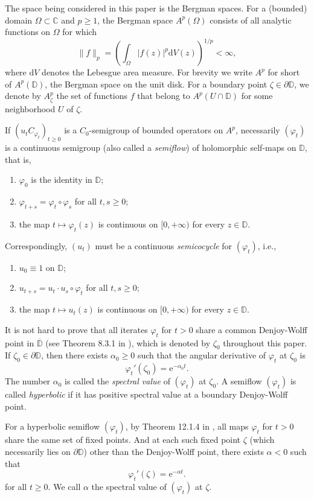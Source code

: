 \documentclass{amsart}
\theoremstyle{proclaim}
\theoremstyle{fancyproclaim}
\theoremstyle{definition}
\theoremstyle{fancystatement}
\numberwithin{equation}{section}
\begin{document}
The space being considered in this paper is the Bergman spaces. For a (bounded) domain $\Omega\subset\mathbb{C}$ and $p\geq 1$, the Bergman space $A^p(\Omega)$ consists of all analytic functions on $\Omega$ for which
$$\|f\|_p=\left(\int_\Omega|f(z)|^p\mathrm{d}V(z)\right)^{1/p}<\infty,$$
where $\mathrm{d}V$ denotes the Lebesgue area measure. For brevity we write $A^p$ for short of $A^p(\mathbb{D})$, the Bergman space on the unit disk. For a boundary point $\zeta\in\partial \mathbb{D}$, we denote by $A^p_\zeta$ the set of functions $f$  that belong to $A^p(U\cap\mathbb{D})$ for some neighborhood $U$ of $\zeta$.

If $(u_tC_{\varphi_t})_{t\geq0}$ is a  $C_0$-semigroup of bounded operators on $A^p$, necessarily $(\varphi_t)$ is a continuous semigroup (also called a \emph{semiflow}) of holomorphic self-maps on $\mathbb{D}$, that is,
\begin{enumerate}
\item $\varphi_0$ is the identity in $\mathbb{D}$;
\item $\varphi_{t+s} = \varphi_t \circ\varphi_s$ for all $t,s \geq 0$;
\item the map $t \mapsto \varphi_t(z)$ is continuous on $[0,+\infty)$ for every $z \in\mathbb{D}$.
\end{enumerate}
Correspondingly, $(u_t)$ must be a continuous  \emph{semicocycle} for  $(\varphi_t)$, i.e.,
\begin{enumerate}
\item $u_0 \equiv 1$ on $\mathbb{D}$;
\item $u_{t+s}=u_t  \cdot u_s\circ\varphi_t$ for all $t,s\geq0$;
\item the map $t \mapsto u_t(z)$ is continuous on $[0,+\infty)$ for every $z \in \mathbb{D}$.
\end{enumerate}


It is not hard to prove that all iterates $\varphi_t$ for $t>0$ share a common Denjoy-Wolff point in $\overline{\mathbb{D}}$ (see Theorem 8.3.1 in \cite{cs}), which is denoted by $\zeta_0$ throughout this paper. If $\zeta_0\in \partial \mathbb{D}$, then there exists $\alpha_0\geq0$ such that the angular derivative of $\varphi_t$ at $\zeta_0$ is
$$\varphi_t'(\zeta_0)= \mathrm{e}^{-\alpha_0t}.$$
The number $\alpha_0$ is called the \emph{spectral value} of  $(\varphi_t)$ at $\zeta_0$. A semiflow  $(\varphi_t)$ is called \emph{hyperbolic} if it has positive spectral value at a boundary Denjoy-Wolff point.


For a hyperbolic semiflow  $(\varphi_t)$, by Theorem 12.1.4 in \cite{cs}, all maps $\varphi_t$ for $t>0$ share the same set of fixed points. And at each such fixed point $\zeta$ (which necessarily lies on $\partial\mathbb{D}$) other than the Denjoy-Wolff point, there exists $\alpha<0$ such that 
$$\varphi_t'(\zeta)= \mathrm{e}^{-\alpha t}.$$
for all $t\geq0$. We call $\alpha$ the spectral value of $(\varphi_t)$ at $\zeta$.
\end{document}

